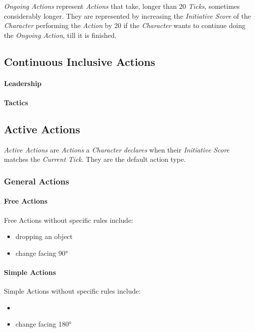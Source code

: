 \emph{Ongoing Actions} represent \emph{Actions} that take, longer than 20
\emph{Ticks}, sometimes considerably longer. They are represented by increasing
the \emph{Initiative Score} of the \emph{Character} performing the \emph{Action}
by 20 if the \emph{Character} wants to continue doing the \emph{Ongoing Action},
till it is finished.

\subsection{Continuous Inclusive Actions}

\paragraph{Leadership}

\paragraph{Tactics}

\subsection{Active Actions}

\emph{Active Actions} are \emph{Actions} a \emph{Character} \emph{declares} when
their \emph{Initiative Score} matches the \emph{Current Tick}. They are the
default action type.

\subsubsection{General Actions}

\paragraph{Free Actions}
Free Actions without specific rules include:
\begin{itemize}[parsep=0em]
    \item dropping an object
    \item change facing 90°
\end{itemize}

\paragraph{Simple Actions}
Simple Actions without specific rules include:
\begin{itemize}[parsep=0em]
    \item \item change facing 180°
\end{itemize}

